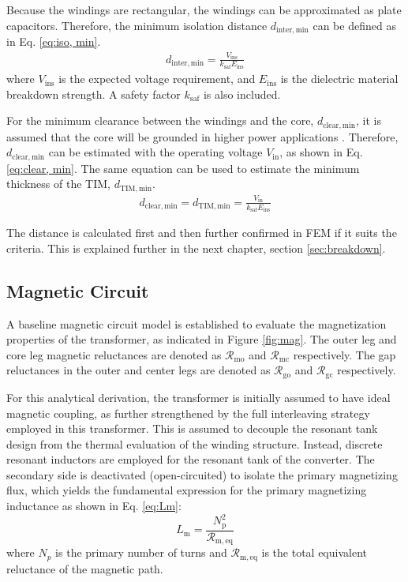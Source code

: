 Because the windings are rectangular, the windings can be approximated as plate capacitors. Therefore, the minimum isolation distance $d_{\mathrm{inter, min}}$ can be defined as in Eq. \ref{eq:iso, min}.
\begin{align}
d_\mathrm{inter, min} = \frac{V_\mathrm{ins}}{k_\mathrm{saf}E_\mathrm{ins}}\label{eq:iso, min}
\end{align}
\noindent where $V_\mathrm{ins}$ is the expected voltage requirement, and $E_\mathrm{ins}$ is the dielectric material breakdown strength. A safety factor $k_{\mathrm{saf}}$ is also included. 

For the minimum clearance between the windings and the core, $d_{\mathrm{clear, min}}$, it is assumed that the core will be grounded in higher power applications \cite{bahmani2016design}. Therefore, $d_{\mathrm{clear, min}}$ can be estimated with the operating voltage $V_{\mathrm{in}}$, as shown in Eq. \ref{eq:clear, min}. The same equation can be used to estimate the minimum thickness of the TIM, $d_\mathrm{TIM, min}$.
\begin{align}
d_\mathrm{clear, min} = d_\mathrm{TIM, min} = \frac{V_\mathrm{in}}{k_\mathrm{saf}E_\mathrm{ins}}\label{eq:clear, min}
\end{align}

The distance is calculated first and then further confirmed in FEM if it suits the criteria. This is explained further in the next chapter, section \ref{sec:breakdown}.

\subsection{Magnetic Circuit}
A baseline magnetic circuit model is established to evaluate the magnetization properties of the transformer, as indicated in Figure \ref{fig:mag}. The outer leg and core leg magnetic reluctances are denoted as $\mathcal{R}_\mathrm{mo}$ and $\mathcal{R}_\mathrm{mc}$ respectively. The gap reluctances in the outer and center legs are denoted as $\mathcal{R}_\mathrm{go}$ and $\mathcal{R}_\mathrm{gc}$ respectively. 

For this analytical derivation, the transformer is initially assumed to have ideal magnetic coupling, as further strengthened by the full interleaving strategy employed in this transformer. This is assumed to decouple the resonant tank design from the thermal evaluation of the winding structure. Instead, discrete resonant inductors are employed for the resonant tank of the converter.  The secondary side is deactivated (open-circuited) to isolate the primary magnetizing flux, which yields the fundamental expression for the primary magnetizing inductance as shown in Eq. \ref{eq:Lm}:
\begin{equation}
L_\mathrm{m} = \frac{N_\mathrm{p}^2}{\mathcal{R}_{\mathrm{m, eq}}}\label{eq:Lm}
\end{equation}
where $N_p$ is the primary number of turns and $\mathcal{R}_\mathrm{m, eq}$ is the total equivalent reluctance of the magnetic path.

